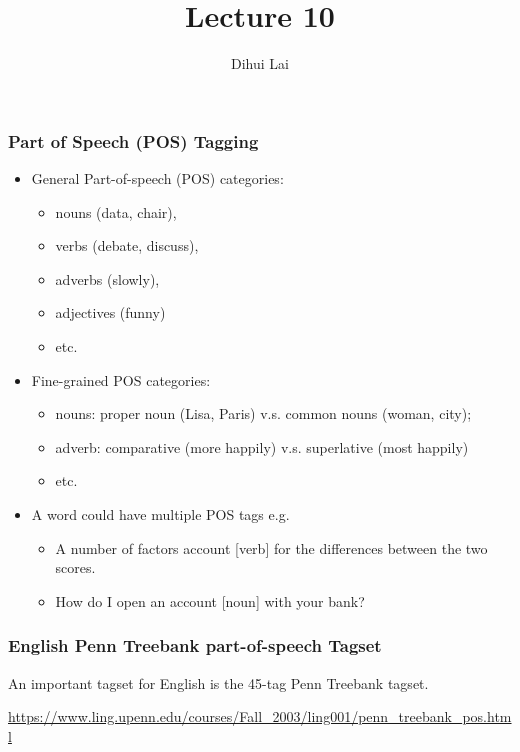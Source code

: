 \documentclass[notheorems, aspectratio=54]{beamer}
\title{Lecture 10}
\author{Dihui Lai}
\institute[WUSTL]{dlai@wustl.edu}
\begin{document}
\begin{frame}
    \titlepage
\end{frame}
\begin{frame}
\frametitle{Part of Speech (POS) Tagging}
\begin{itemize}
\item General Part-of-speech (POS) categories: 
\begin{itemize}
\item nouns (data, chair),
\item verbs (debate, discuss),
\item  adverbs (slowly), 
\item  adjectives (funny)
\item etc.
\end{itemize}
\item Fine-grained POS categories:
\begin{itemize}
\item nouns: proper noun (Lisa, Paris) v.s. common nouns (woman, city); 
\item adverb: comparative (more happily) v.s. superlative (most happily)
\item etc.
\end{itemize}
\item A word could have multiple POS tags e.g. 
\begin{itemize}
\item A number of factors account [verb] for the differences between the two scores.
\item How do I open an account [noun] with your bank?
\end{itemize}
\end{itemize}
\end{frame}

\begin{frame}

\frametitle{English Penn Treebank part-of-speech Tagset}

An important tagset for English is the 45-tag Penn Treebank tagset. 

\vspace{1cm}

\url{https://www.ling.upenn.edu/courses/Fall_2003/ling001/penn_treebank_pos.html}

\end{frame}
\end{document}
